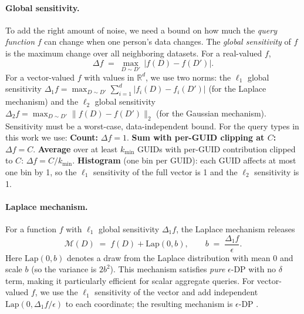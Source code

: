 \documentclass[12pt,letterpaper]{article}
\begin{document}
\paragraph{Global sensitivity.}
To add the right amount of noise, we need a bound on how much the \emph{query function} $f$ can change when one person's data changes. The \emph{global sensitivity} of $f$ is the maximum change over all neighboring datasets. For a real-valued $f$,
\begin{equation}
\Delta f \;=\; \max_{D \sim D'} \, \bigl| f(D) - f(D') \bigr|.
\end{equation}
For a vector-valued $f$ with values in $\mathbb{R}^d$, we use two norms: the $\ell_1$ global sensitivity $\Delta_1 f = \max_{D \sim D'} \sum_{i=1}^d |f_i(D) - f_i(D')|$ (for the Laplace mechanism) and the $\ell_2$ global sensitivity $\Delta_2 f = \max_{D \sim D'} \|f(D) - f(D')\|_2$ (for the Gaussian mechanism). Sensitivity must be a worst-case, data-independent bound. For the query types in this work we use: \textbf{Count:} $\Delta f = 1$. \textbf{Sum with per-GUID clipping at $C$:} $\Delta f = C$. \textbf{Average} over at least $k_{\min}$ GUIDs with per-GUID contribution clipped to $C$: $\Delta f = C/k_{\min}$. \textbf{Histogram} (one bin per GUID): each GUID affects at most one bin by 1, so the $\ell_1$ sensitivity of the full vector is 1 and the $\ell_2$ sensitivity is 1.

\paragraph{Laplace mechanism.}
For a function $f$ with $\ell_1$ global sensitivity $\Delta_1 f$, the Laplace mechanism \cite{dwork2006calibrating,dwork2014promise} releases
\begin{equation}
\mathcal{M}(D) \;=\; f(D) + \text{Lap}(0, b), \qquad b \;=\; \frac{\Delta_1 f}{\epsilon}.
\end{equation}
Here $\text{Lap}(0,b)$ denotes a draw from the Laplace distribution with mean 0 and scale $b$ (so the variance is $2b^2$). This mechanism satisfies \emph{pure} $\epsilon$-DP with no $\delta$ term, making it particularly efficient for scalar aggregate queries. For vector-valued $f$, we use the $\ell_1$ sensitivity of the vector and add independent $\text{Lap}(0, \Delta_1 f/\epsilon)$ to each coordinate; the resulting mechanism is $\epsilon$-DP \cite{dwork2014promise}.
\end{document}
